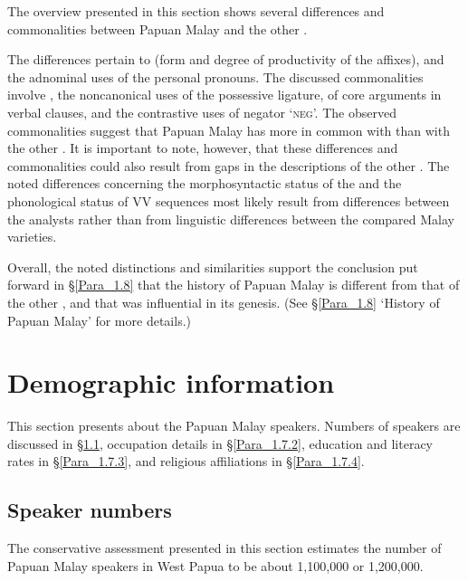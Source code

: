 {The overview presented in this section shows several differences and commonalities between Papuan Malay and the other .



The differences pertain to  (form and degree of productivity of the affixes), and the adnominal uses of the personal pronouns. The discussed commonalities involve , the noncanonical uses of the possessive ligature,  of core arguments in verbal clauses, and the contrastive uses of negator  ‘\textsc{neg}’. The observed commonalities suggest that Papuan Malay has more in common with  than with the other . It is important to note, however, that these differences and commonalities could also result from gaps in the descriptions of the other . The noted differences concerning the morphosyntactic status of the  and the phonological status of VV sequences most likely result from differences between the analysts rather than from linguistic differences between the compared Malay varieties.



Overall, the noted distinctions and similarities support the conclusion put forward in §\ref{Para_1.8} that the history of Papuan Malay is different from that of the other , and that  was influential in its genesis. (See §\ref{Para_1.8} ‘History of Papuan Malay’ for more details.)


\section{Demographic information}\label{Para_1.7}
This section presents  about the Papuan Malay speakers. Numbers of speakers are discussed in §\ref{Para_1.7.1}, occupation details in §\ref{Para_1.7.2}, education and literacy rates in §\ref{Para_1.7.3}, and religious affiliations in §\ref{Para_1.7.4}.


\subsection{Speaker numbers}\label{Para_1.7.1}
The conservative assessment presented in this section estimates the number of Papuan Malay speakers in West Papua to be about 1,100,000 or 1,200,000.



}

